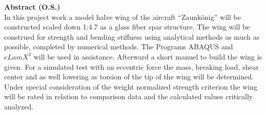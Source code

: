 

\noindent\large{\textbf{Abstract (O.S.)}}~\\

\noindent In this project work a model halve wing of the aircraft “Zaunkönig” will be constructed scaled down 1:4.7 as a glass fiber spar structure. The wing will be construed for strength and bending stiffness using analytical methods as much as possible, completed by numerical methods. The Programs ABAQUS and $ eLamX^{2} $ will be used in assistance. Afterward a short manuel to build the wing is given. For a simulated test with an eccentric force the mass, breaking load, shear center and as well lowering as torsion of the tip of the wing will be determined. Under special consideration of the weight normalized strength criterion the wing will be rated in relation to comparison data and the calculated values critically analyzed. 